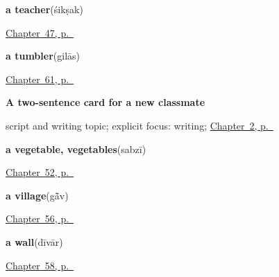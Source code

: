 \noindent\begin{minipage}[t]{\linewidth}
\raggedright
\textbf{a teacher}\enspace\emph{}\enspace(śikṣak)\par
\footnotesize \hyperref[ch:hi-roles]{Chapter~47, p.~\pageref*{ch:hi-roles}}
\end{minipage}\par\smallskip

\noindent\begin{minipage}[t]{\linewidth}
\raggedright
\textbf{a tumbler}\enspace\emph{}\enspace(gilās)\par
\footnotesize \hyperref[ch:hi-at-the-cooking-fire]{Chapter~61, p.~\pageref*{ch:hi-at-the-cooking-fire}}
\end{minipage}\par\smallskip

\noindent\begin{minipage}[t]{\linewidth}
\raggedright
\textbf{A two-sentence card for a new classmate}\par
\footnotesize script and writing topic; explicit focus: writing; \hyperref[ch:introductions]{Chapter~2, p.~\pageref*{ch:introductions}}
\end{minipage}\par\smallskip

\noindent\begin{minipage}[t]{\linewidth}
\raggedright
\textbf{a vegetable, vegetables}\enspace\emph{}\enspace(sabzī)\par
\footnotesize \hyperref[ch:hi-in-the-kitchen]{Chapter~52, p.~\pageref*{ch:hi-in-the-kitchen}}
\end{minipage}\par\smallskip

\noindent\begin{minipage}[t]{\linewidth}
\raggedright
\textbf{a village}\enspace\emph{}\enspace(gā̃v)\par
\footnotesize \hyperref[ch:hi-the-road]{Chapter~56, p.~\pageref*{ch:hi-the-road}}
\end{minipage}\par\smallskip

\noindent\begin{minipage}[t]{\linewidth}
\raggedright
\textbf{a wall}\enspace\emph{}\enspace(dīvār)\par
\footnotesize \hyperref[ch:hi-inside-the-house]{Chapter~58, p.~\pageref*{ch:hi-inside-the-house}}
\end{minipage}\par\smallskip

